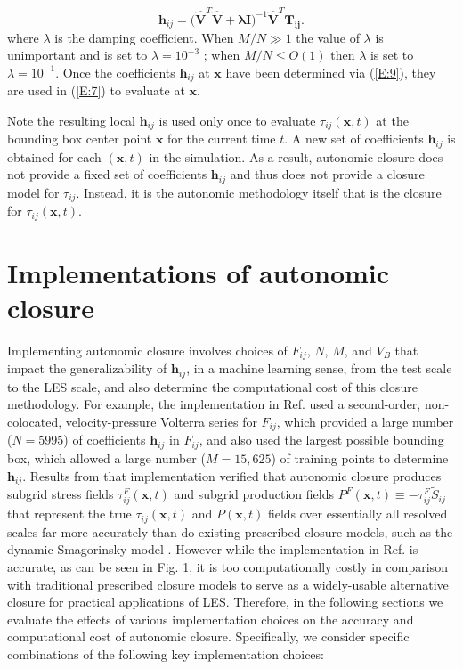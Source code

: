 %
\begin{equation}
	\label{E:9}
	\mathbf{h}_{ij} 
	= \bigg( \mathbf{\widehat{V}}^T \mathbf{\widehat{V}} + \mathbf{\lambda I} \bigg)^{-1} 
	\mathbf{\widehat{V}}^T \mathbf{T_{ij}}.
\end{equation}
%
%      
where  $\lambda$ is the damping coefficient. When $M/N \gg 1$  the value of  $\lambda$ is unimportant and is set to $\lambda = 10^{-3}$ ; when $M/N \leq O(1)$  then $\lambda$   is set to $\lambda = 10^{-1}$. Once the coefficients $\mathbf{h}_{ij}$  at $\mathbf{x}$ have been determined via (\ref{E:9}), they are used in (\ref{E:7}) to evaluate   at $\mathbf{x}$. 

Note the resulting local $\mathbf{h}_{ij}$   is used only once to evaluate $\tau_{ij}(\mathbf{x},t)$   at the bounding box center point $\mathbf{x}$ for the current time $t$. A new set of coefficients  $\mathbf{h}_{ij}$ is obtained for each $(\mathbf{x},t)$  in the simulation. As a result, autonomic closure does not provide a fixed set of coefficients $\mathbf{h}_{ij}$  and thus does not provide a closure model for $\tau_{ij}$. Instead, it is the autonomic methodology itself that is the closure for $\tau_{ij}(\mathbf{x},t)$.

\section{Implementations of autonomic closure }
\label{sec:IIB}

Implementing autonomic closure involves choices of $F_{ij}$, $N$, $M$, and $V_B$ that impact the generalizability of $\mathbf{h}_{ij}$, in a machine learning sense, from the test scale to the LES scale, and also determine the computational cost of this closure methodology. For example, the implementation in Ref. \cite{king2016autonomic} used a second-order, non-colocated, velocity-pressure Volterra series for $F_{ij}$, which provided a large number ($N = 5995$) of coefficients $\mathbf{h}_{ij}$  in $F_{ij}$, and also used the largest possible bounding box, which allowed a large number ($M  = 15,625$) of training points to determine $\mathbf{h}_{ij}$. Results from that implementation verified that autonomic closure produces subgrid stress fields $\tau_{ij}^{F}(\mathbf{x},t)$   and subgrid production fields  $P^{F}(\mathbf{x},t) \equiv -\tau_{ij}^{F}\widetilde{S}_{ij}$ that represent the true $\tau_{ij}(\mathbf{x},t)$  and  $P(\mathbf{x},t)$   fields over essentially all resolved scales far more accurately than do existing prescribed closure models, such as the dynamic Smagorinsky model \cite{king2016autonomic}. 
However while the implementation in Ref. \cite{king2016autonomic} is accurate, as can be seen in Fig. 1, it is too computationally costly in comparison with traditional prescribed closure models to serve as a widely-usable alternative closure for practical applications of LES. Therefore, in the following sections we evaluate the effects of various implementation choices on the accuracy and computational cost of autonomic closure. Specifically, we consider specific combinations of the following key implementation choices: 

